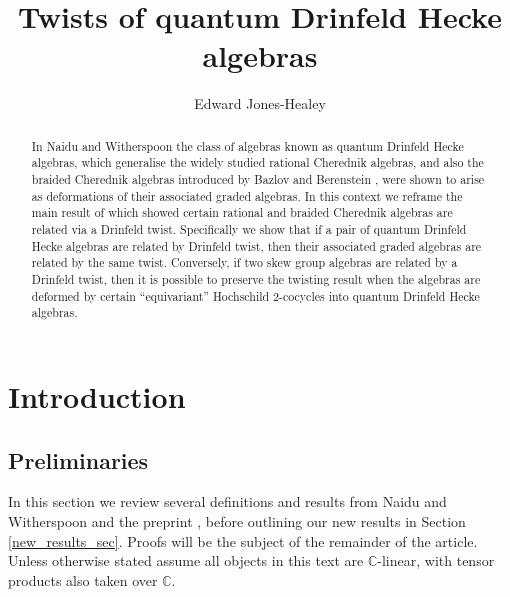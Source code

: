 \documentclass[10pt]{article}
\title{Twists of quantum Drinfeld Hecke algebras}
\author{Edward Jones-Healey}
\date{}
\newcommand{\bb}{\medbreak}
\newcommand{\Cc }{\mathbb{C}}
\theoremstyle{definition}
\begin{document}
\maketitle

\begin{abstract} In Naidu and Witherspoon \cite{2011arXiv11115243N} the class of algebras known as quantum Drinfeld Hecke algebras, which generalise the widely studied rational Cherednik algebras, and also the braided Cherednik algebras introduced by Bazlov and Berenstein \cite{bazlov2009noncommutative}, were shown to arise as deformations of their associated graded algebras. In this context we reframe the main result of \cite{twistsrcas} which showed certain rational and braided Cherednik algebras are related via a Drinfeld twist. Specifically we show that if a pair of quantum Drinfeld Hecke algebras are related by Drinfeld twist, then their associated graded algebras are related by the same twist. Conversely, if two skew group algebras are related by a Drinfeld twist, then it is possible to preserve the twisting result when the algebras are deformed by certain ``equivariant'' Hochschild $2$-cocycles into quantum Drinfeld Hecke algebras.
  
\end{abstract}

\tableofcontents

%

%

\section{Introduction}
\subsection{Preliminaries}
In this section we review several definitions and results from Naidu and Witherspoon \cite{2011arXiv11115243N} and the preprint \cite{twistsrcas}, before outlining our new results in Section \ref{new_results_sec}. Proofs will be the subject of the remainder of the article. Unless otherwise stated assume all objects in this text are $\Cc $-linear, with tensor products also taken over $\Cc $.\bb
\end{document}
